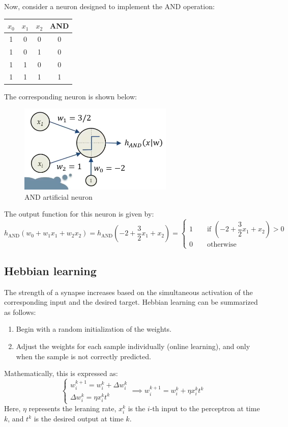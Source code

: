 \begin{example}
    Now, consider a neuron designed to implement the AND operation:
    \begin{table}[H]
        \centering
        \begin{tabular}{ccc|c}
        $x_0$ & $x_1$ & $x_2$ & \textbf{AND} \\ \hline
        1     & 0     & 0     & 0           \\
        1     & 0     & 1     & 0           \\
        1     & 1     & 0     & 0           \\
        1     & 1     & 1     & 1          
        \end{tabular}
    \end{table}
    The corresponding neuron is shown below:
    \begin{figure}[H]
        \centering
        \includegraphics[width=0.75\linewidth]{images/and.png}
        \caption{AND artificial neuron}
    \end{figure}
    The output function for this neuron is given by:
    \[h_{\text{AND}}(w_0+w_1x_1+w_2x_2)=h_{\text{AND}}\left(-2+\dfrac{3}{2}x_1+x_2\right)=\begin{cases} 1\qquad\text{if }\left(-2+\dfrac{3}{2}x_1+x_2\right)>0 \\ 0\qquad\text{otherwise} \end{cases}\]
\end{example}

\subsection{Hebbian learning}
The strength of a synapse increases based on the simultaneous activation of the corresponding input and the desired target. 
Hebbian learning can be summarized as follows:
\begin{enumerate}
    \item Begin with a random initialization of the weights.
    \item Adjust the weights for each sample individually (online learning), and only when the sample is not correctly predicted.
\end{enumerate}
Mathematically, this is expressed as:
\[\begin{cases}
    w_i^{k+1}=w_i^k+\Delta w_i^k \\
    \Delta w_i^k=\eta x_i^kt^k
\end{cases} \implies w_i^{k+1}=w_i^k+\eta x_i^kt^k\]
Here, $\eta$ represents the leraning rate, $x_i^k$ is the $i$-th input to  the perceptron at time $k$, and $t^k$ is the desired output at time $k$.

